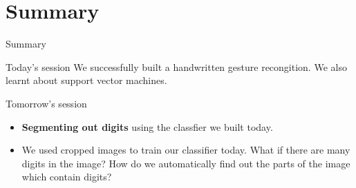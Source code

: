 \documentclass{beamer}
\begin{document}
\section*{Summary}
\begin{frame}{Summary}
    \begin{block}{Today's session}
        We successfully built a handwritten gesture recongition. We also learnt
        about support vector machines.
    \end{block}
    \begin{block}{Tomorrow's session}
        \begin{itemize}
        \item \textbf{Segmenting out digits} using the classfier we built today. 
        \item We used cropped images to train our classifier today. What if there are 
        many digits in the image? How do we automatically find out the parts of the 
        image which contain digits?
        \end{itemize}
    \end{block}
\end{frame}
\end{document}

